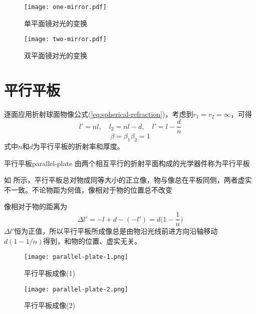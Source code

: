 \documentclass[cn,10pt,chinesefont=founder,math=newtx,cite=super,twoside]{elegantbook}
\begin{document}
\begin{figure}[htbp]
	\centering
	\begin{minipage}[t]{0.45\textwidth}
		\centering
		\texttt{[image: one-mirror.pdf]}
		\caption{单平面镜对光的变换}
		\label{fig:one-mirror}
	\end{minipage}
	\qquad
	\begin{minipage}[t]{0.45\textwidth}
		\centering
		\texttt{[image: two-mirror.pdf]}
		\caption{双平面镜对光的变换}
		\label{fig:two-mirror}
	\end{minipage}
\end{figure}

\section{平行平板}
\label{sect:parallel-plate}

逐面应用折射球面物像公式(\ref{eq:spherical-refraction})，考虑到$r_1=r_2=\infty$，可得
\begin{equation}
l'=nl,\quad l_2=nl-d,\quad l'=l-\frac{d}{n}
\end{equation}
\begin{equation}
\beta=\beta_1\beta_2=1
\end{equation}
式中$n$和$d$为平行平板的折射率和厚度。

\begin{definition}{平行平板}{parallel-plate}
	由两个相互平行的折射平面构成的光学器件称为平行平板
\end{definition}

\begin{property}
如 所示，平行平板总对物成同等大小的正立像，物与像总在平板同侧，两者虚实不一致。不论物距为何值，像相对于物的位置总不改变
\end{property}

像相对于物的距离为
\begin{equation}
\Delta l'=-l+d-(-l')=d\bigg(1-\frac{1}{n}\bigg)
\end{equation}
$\Delta l'$恒为正值，所以平行平板所成像总是由物沿光线前进方向沿轴移动$d(1-1/n)$得到，和物的位置、虚实无关。

\begin{figure}[htbp]
	\centering
	\begin{minipage}[t]{0.48\textwidth}
		\centering
		\texttt{[image: parallel-plate-1.png]}
		\caption{平行平板成像(1)}
		\label{fig:parallel-plate-1}
	\end{minipage}
	\qquad
	\begin{minipage}[t]{0.45\textwidth}
		\centering
		\texttt{[image: parallel-plate-2.png]}
		\caption{平行平板成像(2)}
		\label{fig:parallel-plate-2}
	\end{minipage}
\end{figure}
\end{document}
